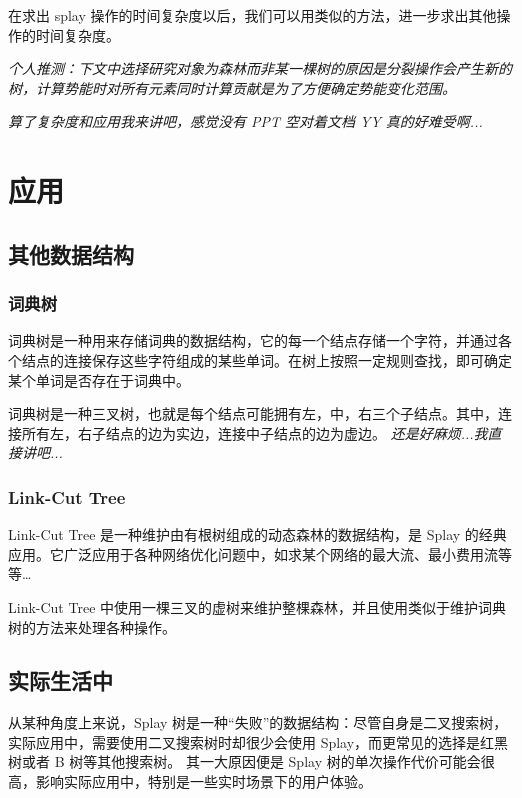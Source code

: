 \documentclass{ctexart}
\begin{document}
    在求出 splay 操作的时间复杂度以后，我们可以用类似的方法，进一步求出其他操作的时间复杂度。
    
    \textit{个人推测：下文中选择研究对象为森林而非某一棵树的原因是分裂操作会产生新的树，计算势能时对所有元素同时计算贡献是为了方便确定势能变化范围。}

    \textit{算了复杂度和应用我来讲吧，感觉没有 PPT 空对着文档 YY 真的好难受啊...}

    \section{应用}

    \subsection{其他数据结构}

    \subsubsection{词典树}

    词典树是一种用来存储词典的数据结构，它的每一个结点存储一个字符，并通过各个结点的连接保存这些字符组成的某些单词。在树上按照一定规则查找，即可确定某个单词是否存在于词典中。

    词典树是一种三叉树，也就是每个结点可能拥有左，中，右三个子结点。其中，连接所有左，右子结点的边为实边，连接中子结点的边为虚边。
    \textit{还是好麻烦...我直接讲吧...}

    \subsubsection{Link-Cut Tree}

    Link-Cut Tree 是一种维护由有根树组成的动态森林的数据结构，是 Splay 的经典应用。它广泛应用于各种网络优化问题中，如求某个网络的最大流、最小费用流等等\dots

    Link-Cut Tree 中使用一棵三叉的虚树来维护整棵森林，并且使用类似于维护词典树的方法来处理各种操作。

    \subsection{实际生活中}

    从某种角度上来说，Splay 树是一种``失败''的数据结构：尽管自身是二叉搜索树，实际应用中，需要使用二叉搜索树时却很少会使用 Splay，而更常见的选择是红黑树或者 B 树等其他搜索树。
    其一大原因便是 Splay 树的单次操作代价可能会很高，影响实际应用中，特别是一些实时场景下的用户体验。
\end{document}
